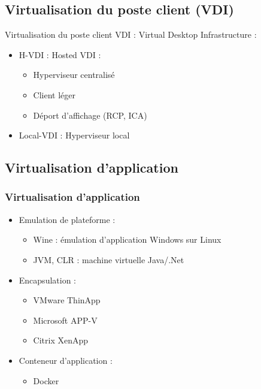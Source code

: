 \subsection{Virtualisation du poste client (VDI)}

\begin{frame}{Virtualisation du poste client}
VDI : Virtual Desktop Infrastructure :
\begin{itemize}
\item H-VDI : Hosted VDI :
\begin{itemize}
\item Hyperviseur centralisé
\item Client léger
\item Déport d'affichage (RCP, ICA)
\end{itemize}

\item Local-VDI : Hyperviseur local
\end{itemize}
\end{frame}

\subsection{Virtualisation d'application}

\begin{frame}
\frametitle{Virtualisation d'application}
\begin{itemize}
\item Emulation de plateforme :
\begin{itemize}
\item Wine : émulation d'application Windows sur Linux
\item JVM, CLR : machine virtuelle Java/.Net
\end{itemize}
\item Encapsulation :
\begin{itemize}
\item  VMware ThinApp
\item Microsoft APP-V
\item Citrix XenApp
\end{itemize}
\item Conteneur d'application :
\begin{itemize}
\item Docker
\end{itemize}

\end{itemize}
\end{frame}

